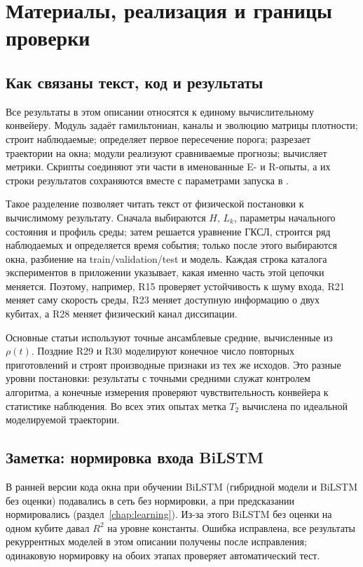 \chapter{Материалы, реализация и границы проверки}
\label{chap:materials}

\section{Как связаны текст, код и результаты}
Все результаты в этом описании относятся к единому вычислительному
конвейеру. Модуль  задаёт гамильтониан, каналы и
эволюцию матрицы плотности;  строит
наблюдаемые;  определяет первое пересечение
порога;  разрезает траектории на окна; модули
 реализуют сравниваемые прогнозы; 
вычисляет метрики. Скрипты  соединяют эти части в
именованные E- и R-опыты, а их строки результатов сохраняются вместе с
параметрами запуска в .

Такое разделение позволяет читать текст от физической постановки к
вычислимому результату. Сначала выбираются $H$, $L_k$, параметры начального
состояния и профиль среды; затем решается уравнение ГКСЛ, строится ряд
наблюдаемых и определяется время события; только после этого выбираются
окна, разбиение на train/validation/test и модель. Каждая строка каталога
экспериментов в приложении указывает, какая именно часть этой цепочки
меняется. Поэтому, например, R15 проверяет устойчивость к шуму входа, R21
меняет саму скорость среды, R23 меняет доступную информацию о двух кубитах,
а R28 меняет физический канал диссипации.

Основные статьи используют точные ансамблевые средние, вычисленные из
$\rho(t)$. Поздние R29 и R30 моделируют конечное число повторных
приготовлений и строят производные признаки из тех же исходов. Это разные
уровни постановки: результаты с точными средними служат контролем алгоритма,
а конечные измерения проверяют чувствительность конвейера к статистике
наблюдения. Во всех этих опытах метка $T_2$ вычислена по идеальной
моделируемой траектории.

\section{Заметка: нормировка входа BiLSTM}
\label{sec:bug}
В ранней версии кода окна при обучении BiLSTM (гибридной модели и BiLSTM
без оценки) подавались в сеть без нормировки, а при предсказании
нормировались (раздел~\ref{chap:learning}). Из-за этого BiLSTM без оценки на
одном кубите давал $R^2$ на уровне константы. Ошибка исправлена, все
результаты рекуррентных моделей в этом описании получены после исправления;
одинаковую нормировку на обоих этапах проверяет автоматический тест.

